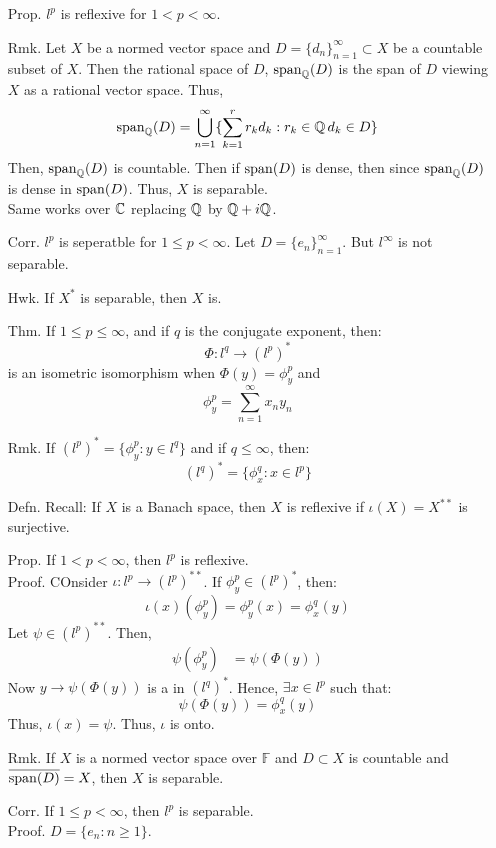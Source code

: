 \documentclass[12pt]{article}
\begin{document}
\begin{itemize}
    \item[Prop.] $l^p$ is reflexive for $1 < p < \infty$.
    \item[Rmk.] Let $X$ be a normed vector space and $D = \{d_n\}_{n=1}^\infty \subset X$ be a countable subset of $X$. Then the rational space of $D$, $\operatorname{span}_\mathbb Q(D)$ is the span of $D$ viewing $X$ as a rational vector space. Thus,
    \[\operatorname{span}_\mathbb Q(D) = \bigcup_{n=1}^\infty \{\sum_{k=1}^r r_kd_k : r_k\in\mathbb Q \, d_k \in D\}\]
    Then, $\operatorname{span}_\mathbb Q(D)$ is countable. Then if $\operatorname{span}(D)$ is dense, then since $\operatorname{span}_\mathbb Q(D)$ is dense in $\operatorname{span}(D)$. Thus, $X$ is separable. \\
    Same works over $\mathbb C$ replacing $\mathbb Q$ by $\mathbb Q + i\mathbb Q$. 
    \item[Corr.] $l^p$ is seperatble for $1 \leq p < \infty$. Let $D = \{e_n\}_{n=1}^\infty$. But $l^\infty$ is not separable. 
    \item[Hwk.] If $X^*$ is separable, then $X$ is.  
    \newpage 
    \item[Thm.] If $1 \leq p \leq \infty$, and if $q$ is the conjugate exponent, then: 
    \[ \Phi: l^q \to (l^p)^* \]
    is an isometric isomorphism when $\Phi(y) = \phi_y^p$ and 
    \[ \phi_y^p = \sum_{n=1}^{\infty} x_ny_n\]
    \item[Rmk.] If $(l^p)^* = \{\phi_y^p : y \in l^q\}$ and if $q \leq \infty$, then: 
    \[ (l^q)^* = \{\phi_x^q : x \in l^p\}\] 
    \item[Defn.] Recall: If $X$ is a Banach space, then $X$ is reflexive if $\iota(X) = X^{**}$ is surjective.
    \item[Prop.] If $1 < p < \infty$, then $l^p$ is reflexive.\\ 
    Proof. COnsider $\iota: l^p \to (l^p)^{**}$. If $\phi_y^p \in (l^p)^*$, then: 
    \[ \iota(x)(\phi_y^p) = \phi_y^p(x) = \phi_x^q(y) \]
    Let $\psi \in (l^p)^{**}$. Then,
    \begin{align*}
        \psi(\phi_y^p) &= \psi(\Phi(y))
    \end{align*}
    Now $y \to \psi(\Phi(y))$ is a in $(l^q)^*$. Hence, $\exists x \in l^p$ such that:
    \[ \psi(\Phi(y)) = \phi_x^q(y) \]
    Thus, $\iota(x) = \psi$. Thus, $\iota$ is onto.
    \item[Rmk.] If $X$ is a normed vector space over $\mathbb{F}$ and $D \subset X$ is countable and $\overline{\operatorname{span}(D)} = X$, then $X$ is separable. 
    \item[Corr.] If $1 \leq p < \infty$, then $l^p$ is separable. \\
    Proof. $D = \{e_n : n \geq 1\}$.  

\end{itemize}
\end{document}
